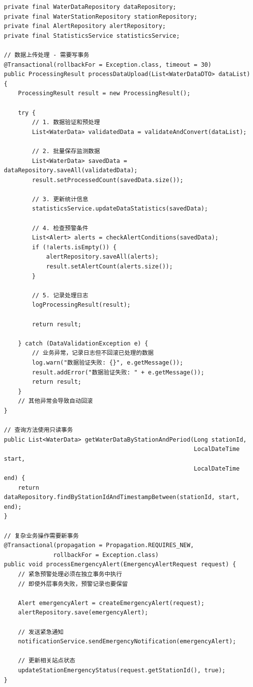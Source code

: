\begin{verbatim}
private final WaterDataRepository dataRepository;
private final WaterStationRepository stationRepository;
private final AlertRepository alertRepository;
private final StatisticsService statisticsService;

// 数据上传处理 - 需要写事务
@Transactional(rollbackFor = Exception.class, timeout = 30)
public ProcessingResult processDataUpload(List<WaterDataDTO> dataList) {
    ProcessingResult result = new ProcessingResult();
    
    try {
        // 1. 数据验证和预处理
        List<WaterData> validatedData = validateAndConvert(dataList);
        
        // 2. 批量保存监测数据
        List<WaterData> savedData = dataRepository.saveAll(validatedData);
        result.setProcessedCount(savedData.size());
        
        // 3. 更新统计信息
        statisticsService.updateDataStatistics(savedData);
        
        // 4. 检查预警条件
        List<Alert> alerts = checkAlertConditions(savedData);
        if (!alerts.isEmpty()) {
            alertRepository.saveAll(alerts);
            result.setAlertCount(alerts.size());
        }
        
        // 5. 记录处理日志
        logProcessingResult(result);
        
        return result;
        
    } catch (DataValidationException e) {
        // 业务异常，记录日志但不回滚已处理的数据
        log.warn("数据验证失败: {}", e.getMessage());
        result.addError("数据验证失败: " + e.getMessage());
        return result;
    }
    // 其他异常会导致自动回滚
}

// 查询方法使用只读事务
public List<WaterData> getWaterDataByStationAndPeriod(Long stationId, 
                                                      LocalDateTime start, 
                                                      LocalDateTime end) {
    return dataRepository.findByStationIdAndTimestampBetween(stationId, start, end);
}

// 复杂业务操作需要新事务
@Transactional(propagation = Propagation.REQUIRES_NEW, 
              rollbackFor = Exception.class)
public void processEmergencyAlert(EmergencyAlertRequest request) {
    // 紧急预警处理必须在独立事务中执行
    // 即使外层事务失败，预警记录也要保留
    
    Alert emergencyAlert = createEmergencyAlert(request);
    alertRepository.save(emergencyAlert);
    
    // 发送紧急通知
    notificationService.sendEmergencyNotification(emergencyAlert);
    
    // 更新相关站点状态
    updateStationEmergencyStatus(request.getStationId(), true);
}
\end{verbatim}


